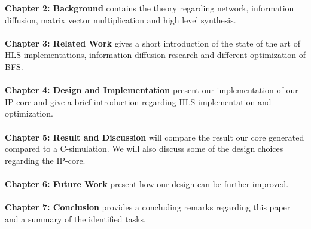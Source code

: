 \textbf{Chapter 2: Background} contains the theory regarding network, information diffusion, matrix vector multiplication and high level synthesis. \\ \hfil \\ \hfil
\textbf{Chapter 3: Related Work} gives a short introduction of the state of the art of HLS implementations, information diffusion research and different optimization of BFS.\\ \hfil \\ \hfil
\textbf{Chapter 4: Design and Implementation} present our implementation of our IP-core and give a brief introduction regarding HLS implementation and optimization.  \\ \hfil \\ \hfil
\textbf{Chapter 5: Result and Discussion} will compare the result our core generated compared to a C-simulation. We will also discuss some of the design choices regarding the IP-core. \\ \hfil \\ \hfil
\textbf{Chapter 6: Future Work} present how our design can be further improved. \\ \hfil \\ \hfil
\textbf{Chapter 7: Conclusion} provides a concluding remarks regarding this paper and a summary of the identified tasks. \\ \hfil \\ \hfil